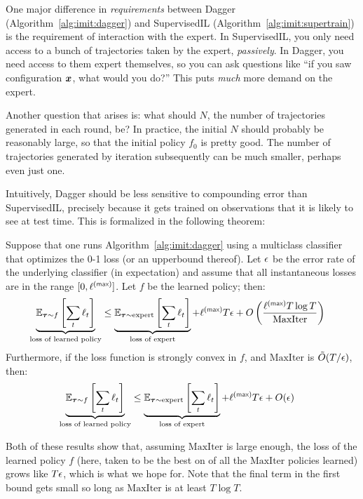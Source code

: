 One major difference in \emph{requirements} between Dagger (Algorithm~\ref{alg:imit:dagger}) and SupervisedIL (Algorithm~\ref{alg:imit:supertrain}) is the requirement of interaction with the expert.
In SupervisedIL, you only need access to a bunch of trajectories taken by the expert, \emph{passively}.
In Dagger, you need access to them expert themselves, so you can ask questions like ``if you saw configuration ${\boldsymbol{x}}$, what would you do?''
This puts \emph{much} more demand on the expert.

Another question that arises is: what should $N$, the number of trajectories generated in each round, be?
In practice, the initial $N$ should probably be reasonably large, so that the initial policy $f_0$ is pretty good.
The number of trajectories generated by iteration subsequently can be much smaller, perhaps even just one.

Intuitively, Dagger should be less sensitive to compounding error than SupervisedIL, precisely because it gets trained on observations that it is likely to see at test time.
This is formalized in the following theorem:

\begin{theorem}
  Suppose that one runs Algorithm~\ref{alg:imit:dagger} using a multiclass classifier that optimizes the 0-1 loss (or an upperbound thereof).
  Let $\epsilon$ be the error rate of the underlying classifier (in expectation) and assume that all instantaneous losses are in the range $[0, \ell\xth{max}]$.
  Let $f$ be the learned policy; then:
  \begin{align}
    \underbrace{\Ep_{\vt \sim f}\left[\sum_t \ell_t\right]}_{\text{loss of learned policy}}
    & \leq
    \underbrace{\Ep_{\vt \sim \text{expert}}\left[\sum_t \ell_t\right]}_{\text{loss of expert}}
      + \ell\xth{max} T \ep
      + O\left( \frac {\ell\xth{max} T \log T} {\text{MaxIter}} \right)
  \end{align}
  Furthermore, if the loss function is strongly convex in $f$, and $\text{MaxIter}$ is $\tilde O(T/\epsilon)$, then:
  \begin{align}
    \underbrace{\Ep_{\vt \sim f}\left[\sum_t \ell_t\right]}_{\text{loss of learned policy}}
    & \leq
    \underbrace{\Ep_{\vt \sim \text{expert}}\left[\sum_t \ell_t\right]}_{\text{loss of expert}}
      + \ell\xth{max} T \ep
      + O(\ep)
  \end{align}
\end{theorem}

Both of these results show that, assuming $\text{MaxIter}$ is large enough, the loss of the learned policy $f$ (here, taken to be the best on of all the $\text{MaxIter}$ policies learned) grows like $T\epsilon$, which is what we hope for.
Note that the final term in the first bound gets small so long as $\text{MaxIter}$ is at least $T \log T$.

